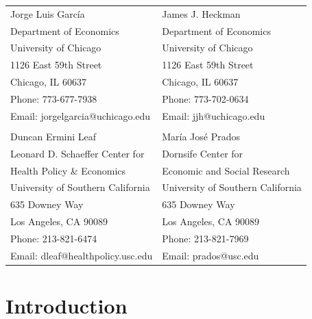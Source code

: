 \bigskip

\begin{tabular}{ll}
Jorge Luis Garc\'{i}a                                       & James J. Heckman \\
Department of Economics                                & Department of Economics \\
University of Chicago                                       & University of Chicago \\
1126 East 59th Street                                     & 1126 East 59th Street \\
Chicago, IL 60637                                           & Chicago, IL 60637 \\
Phone: 773-677-7938                                     & Phone: 773-702-0634  \\
Email: jorgelgarcia@uchicago.edu                       & Email: jjh@uchicago.edu \\
                                                                       & \\
Duncan Ermini Leaf                                           & Mar\'{i}a Jos\'{e} Prados \\
Leonard D. Schaeffer Center for            & Dornsife Center for  \\
Health Policy \& Economics                                          & Economic and Social Research \\
University of Southern California                        & University of Southern California \\
635 Downey Way                                             & 635 Downey Way        \\
Los Angeles, CA 90089                                    & Los Angeles, CA 90089 \\
Phone: 213-821-6474                                     & Phone: 213-821-7969 \\
Email: dleaf@healthpolicy.usc.edu                     & Email: prados@usc.edu \\

\end{tabular}


\clearpage

\restoregeometry
\doublespacing

\setcounter{page}{0}

\section{Introduction}

